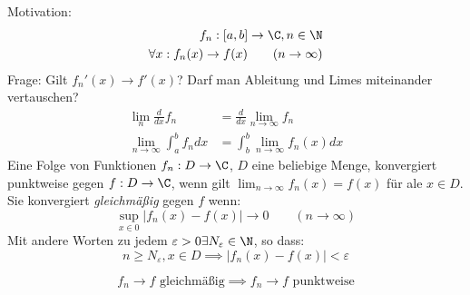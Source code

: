\documentclass{mycourse}
\begin{document}
Motivation:\
\begin{align*}
 f_n:[a,b]\to \C, n\in \N\\
\forall x: f_n(x)\to f(x) \qquad (n\to\infty)\\
\end{align*}
Frage: Gilt $f_n'(x)\to f'(x)$? Darf man Ableitung und Limes miteinander vertauschen?
\begin{align*}
	\lim_n\frac d{dx}f_n&=\frac d{dx}\lim_{n\to\infty}f_n\\
\lim_{n\to\infty}\int_a^bf_ndx&=\int_b^b\lim_{n\to\infty}f_n(x)dx
\end{align*}
Eine Folge von Funktionen $f_n:D\to\C$, $D$ eine beliebige Menge, konvergiert punktweise gegen $f:D\to\C$, wenn gilt $\lim_{n\to\infty}f_n(x)=f(x)$ für ale $x\in D$.
Sie konvergiert \emph{gleichmäßig} gegen $f$ wenn:
\[
\sup_{x\in 0}|f_n(x)-f(x)|\to 0\qquad (n\to\infty)
\]
Mit andere Worten zu jedem $\varepsilon>0 \exists N_\varepsilon \in \N$, so dass:
\[
n\ge N_\varepsilon, x\in D \implies |f_n(x)-f(x)|<\varepsilon
\]
\begin{note}
\[
f_n\to f \text{ gleichmäßig} \implies f_n\to f \text{ punktweise}
\]
\end{note}
\end{document}
